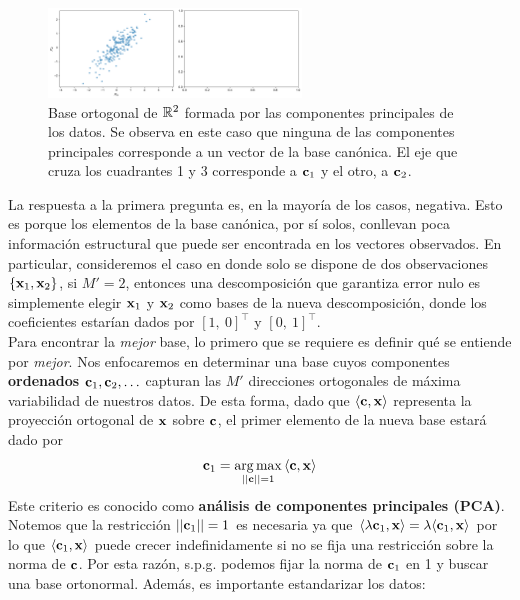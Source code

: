 \begin{figure}[H]
	\centering
	\includegraphics[width=0.6\textwidth]{img/cap6_pca.pdf}
	\caption{Base ortogonal de $\mathbb{R}^2$ formada por las componentes principales de los datos. Se observa en este caso que ninguna de las componentes principales corresponde a un vector de la base canónica. El eje que cruza los cuadrantes 1 y 3 corresponde a $\mathbf{c}_1$ y el otro, a $\mathbf{c}_2$.}
	\label{fig:ej_fda_1}
\end{figure}

La respuesta a la primera pregunta es, en la mayoría de los casos, negativa. Esto es porque los elementos de la base canónica, por sí solos, conllevan poca información estructural que puede ser encontrada en los vectores observados. En particular, consideremos el caso en donde solo se dispone de dos observaciones $\{\mathbf{x}_1, \mathbf{x}_2\}$, si $M'=2$, entonces una descomposición que garantiza error nulo es simplemente elegir $\mathbf{x}_1$ y $\mathbf{x}_2$ como bases de la nueva descomposición, donde los coeficientes estarían dados por $[1,\ 0]^\top$ y $[0,\ 1]^\top$.\\

Para encontrar la \emph{mejor} base, lo primero que se requiere es definir qué se entiende por \emph{mejor}. Nos enfocaremos en determinar una base cuyos componentes \textbf{ordenados} $\mathbf{c}_1,\mathbf{c}_2,\ldots$ capturan las $M'$ direcciones ortogonales de máxima variabilidad de nuestros datos. De esta forma, dado que $\langle\mathbf{c},\mathbf{x}\rangle$ representa la proyección ortogonal de $\mathbf{x}$ sobre $\mathbf{c}$, el primer elemento de la nueva base estará dado por 
\begin{equation}
	\mathbf{c}_1 = \operatorname*{arg\,max}_{||\mathbf{c}||=1} {\langle\mathbf{c},\mathbf{x}\rangle} \label{eq:PCA_max}
\end{equation}
Este criterio es conocido como \textbf{análisis de componentes principales (PCA)}. Notemos que la restricción $||\mathbf{c}_1||=1$ es necesaria ya que $\langle\lambda\mathbf{c}_1,\mathbf{x}\rangle = \lambda\langle\mathbf{c}_1,\mathbf{x}\rangle$ por lo que $\langle\mathbf{c}_1,\mathbf{x}\rangle$ puede crecer indefinidamente si no se fija una restricción sobre la norma de $\mathbf{c}$. Por esta razón, s.p.g. podemos fijar la norma de $\mathbf{c}_1$ en 1 y buscar una base ortonormal. Además, es importante estandarizar los datos:

